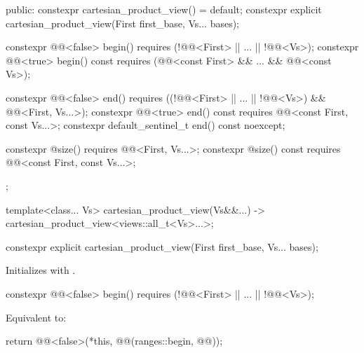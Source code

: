 \begin{codeblock}
{{  public:
    constexpr cartesian_product_view() = default;
    constexpr explicit cartesian_product_view(First first_base, Vs... bases);

    constexpr @@<false> begin()
      requires (!@@<First> || ... || !@@<Vs>);
    constexpr @@<true> begin() const
      requires (@@<const First> && ... && @@<const Vs>);

    constexpr @@<false> end()
      requires ((!@@<First> || ... || !@@<Vs>) &&
        @@<First, Vs...>);
    constexpr @@<true> end() const
      requires @@<const First, const Vs...>;
    constexpr default_sentinel_t end() const noexcept;

    constexpr @\seebelow@ size()
      requires @@<First, Vs...>;
    constexpr @\seebelow@ size() const
      requires @@<const First, const Vs...>;
  };

  template<class... Vs>
    cartesian_product_view(Vs&&...) -> cartesian_product_view<views::all_t<Vs>...>;
}
\end{codeblock}

%
\begin{itemdecl}
constexpr explicit cartesian_product_view(First first_base, Vs... bases);
\end{itemdecl}

\begin{itemdescr}
\pnum
\effects
Initializes 
with .
\end{itemdescr}

%
\begin{itemdecl}
constexpr @@<false> begin()
  requires (!@@<First> || ... || !@@<Vs>);
\end{itemdecl}

\begin{itemdescr}
\pnum
\effects
Equivalent to:
\begin{codeblock}
return @@<false>(*this, @@(ranges::begin, @@));
\end{codeblock}
\end{itemdescr}

